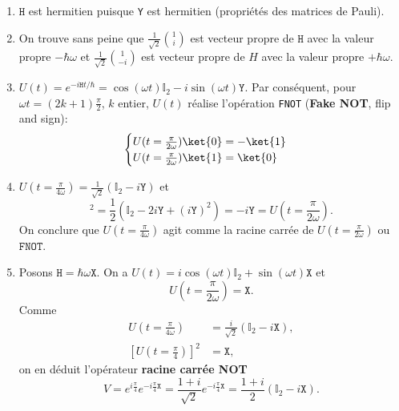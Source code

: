 \begin{enumerate}
\item $\mathtt{H}$ est hermitien puisque \texttt{Y} est hermitien (propriétés
des matrices de Pauli).

\item On trouve sans peine que $\frac{1}{\sqrt{2}}\binom{1}{i}$ est vecteur
propre de $\mathtt{H}$ avec la valeur propre $-\hbar\omega$ et $\frac{1}
{\sqrt{2}}\binom{1}{-i}$ est vecteur propre de $H$ avec la valeur propre
$+\hbar\omega$.

\item $U(t)=e^{-i\mathtt{H}t/\hbar}=\cos(\omega t)\mathbb{I}_2-i\sin(\omega t)
\mathtt{Y}$. Par conséquent, pour $\omega t=(2k+1)\frac{\pi}{2}$, $k$ entier,
$U(t)$ réalise l'opération \texttt{FNOT} (\textbf{Fake NOT}, flip and sign):%
\begin{equation}
\begin{cases}
U(t=\frac{\pi}{2\omega})\ket{0} =-\ket{1} \\
U(t=\frac{\pi}{2\omega})\ket{1} =\ket{0}
\end{cases}
\end{equation}

\item $U(t=\frac{\pi}{4\omega})=\frac{1}{\sqrt{2}}(\mathbb{I}_2-i\mathtt{Y})$ et
\begin{equation}
[U(t=\frac{\pi}{4})]^{2}=\frac{1}{2}(\mathbb{I}_2-2i\mathtt{Y}+(i\mathtt{Y})^2)
=-i\mathtt{Y}=U(t=\frac{\pi}{2\omega}).
\end{equation}
On conclure que $U(t=\frac{\pi}{4\omega})$ agit comme la racine carrée de
$U(t=\frac{\pi}{2\omega})$ ou $\mathtt{FNOT}$.

\item Posons $\mathtt{H}=\hbar\omega\mathtt{X}$. On a $U(t)=i\cos(\omega
t)\mathbb{I}_2+\sin(\omega t)\mathtt{X}$ et
\begin{equation}
 U(t=\frac{\pi}{2\omega})=\mathtt{X}.
\end{equation}
Comme
\begin{subequations}
\begin{align}
 U(t=\frac{\pi}{4\omega}) &=\frac{i}{\sqrt{2}}(\mathbb{I}_2-i\mathtt{X}),\\
 [U(t=\frac{\pi}{4})]^{2} &=\mathtt{X},
\end{align}
\end{subequations}
on en déduit l'opérateur \textbf{racine carrée NOT}
\begin{equation}
V=e^{i\frac{\pi}{4}}e^{-i\frac{\pi}{4}\mathtt{X}}=\frac{1+i}{\sqrt{2}}
e^{-i\frac{\pi}{4}\mathtt{X}}=\frac{1+i}{2}(\mathbb{I} _2-i\mathtt{X}).
\end{equation}

\end{enumerate}


